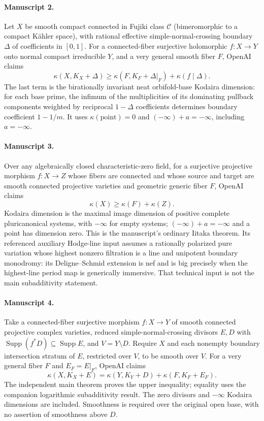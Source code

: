\documentclass[11pt]{article}
\begin{document}
\paragraph{Manuscript 2.}
Let $X$ be smooth compact connected in Fujiki class $\mathcal C$ (bimeromorphic to a compact Kähler space), with rational effective simple-normal-crossing boundary $\Delta$ of coefficients in $[0,1]$. For a connected-fiber surjective holomorphic $f:X\to Y$ onto normal compact irreducible $Y$, and a very general smooth fiber $F$, OpenAI claims
\[
\kappa(X,K_X+\Delta)\ge\kappa(F,K_F+\Delta|_F)+\kappa(f\mid\Delta).
\]
The last term is the birationally invariant neat orbifold-base Kodaira dimension: for each base prime, the infimum of the multiplicities of its dominating pullback components weighted by reciprocal $1-\Delta$ coefficients determines boundary coefficient $1-1/m$. It uses $\kappa(\mathrm{point})=0$ and $(-\infty)+a=-\infty$, including $a=-\infty$.

\paragraph{Manuscript 3.}
Over any algebraically closed characteristic-zero field, for a surjective projective morphism $f:X\to Z$ whose fibers are connected and whose source and target are smooth connected projective varieties and geometric generic fiber $F$, OpenAI claims
\[
\kappa(X)\ge\kappa(F)+\kappa(Z).
\]
Kodaira dimension is the maximal image dimension of positive complete pluricanonical systems, with $-\infty$ for empty systems; $(-\infty)+a=-\infty$ and a point has dimension zero. This is the manuscript's ordinary Iitaka theorem. Its referenced auxiliary Hodge-line input assumes a rationally polarized pure variation whose highest nonzero filtration is a line and unipotent boundary monodromy: its Deligne--Schmid extension is nef and is big precisely when the highest-line period map is generically immersive. That technical input is not the main subadditivity statement.

\paragraph{Manuscript 4.}
Take a connected-fiber surjective morphism $f:X\to Y$ of smooth connected projective complex varieties, reduced simple-normal-crossing divisors $E,D$ with $\operatorname{Supp}(f^*D)\subseteq\operatorname{Supp}E$, and $V=Y\setminus D$. Require $X$ and each nonempty boundary intersection stratum of $E$, restricted over $V$, to be smooth over $V$. For a very general fiber $F$ and $E_F=E|_F$, OpenAI claims
\[
\kappa(X,K_X+E)=\kappa(Y,K_Y+D)+\kappa(F,K_F+E_F).
\]
The independent main theorem proves the upper inequality; equality uses the companion logarithmic subadditivity result. The zero divisors and $-\infty$ Kodaira dimensions are included. Smoothness is required over the original open base, with no assertion of smoothness above $D$.
\end{document}
